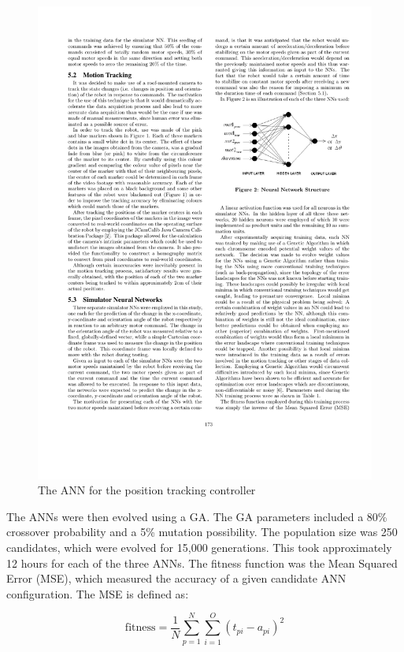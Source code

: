 \documentclass{sig-alternate}
\begin{document}
\begin{figure}%
\begin{center}
  \includegraphics[scale=1]{cr2}
\caption{The ANN for the position tracking controller}
\end{center}
\label{fig:ANN}
\end{figure}

  The ANNs were then evolved using a GA. The GA parameters included a 80\% crossover probability and a 5\% mutation possibility. The population size was 250 candidates, which were evolved for 15,000 generations. This took approximately 12 hours for each of the three ANNs. The fitness function was the Mean Squared Error (MSE), which measured the accuracy of a given candidate ANN configuration. The MSE is defined as:
  
  \[
  \textrm{fitness} = \frac{1}{N}\sum\limits_{p=1}^N\sum\limits_{i=1}^O (t_{pi} - a_{pi})^2
\] 
\end{document}
